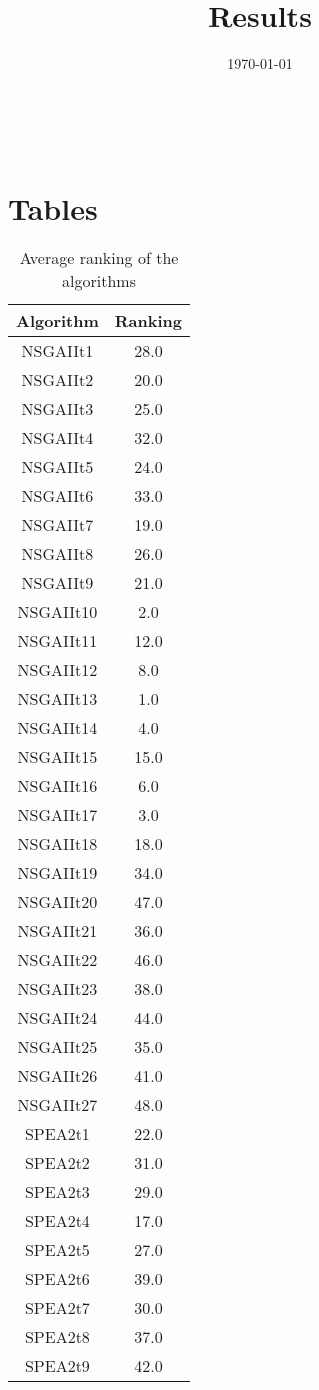 \documentclass{article}
\title{Results}
\author{}
\date{\today}
\begin{document}
\oddsidemargin 0in \topmargin 0in\maketitle
\
\section{Tables}
\begin{table}[!htp]
\centering
\caption{Average ranking of the algorithms}
\begin{tabular}{c|c}
Algorithm&Ranking\\
\hline
NSGAIIt1&28.0\\
NSGAIIt2&20.0\\
NSGAIIt3&25.0\\
NSGAIIt4&32.0\\
NSGAIIt5&24.0\\
NSGAIIt6&33.0\\
NSGAIIt7&19.0\\
NSGAIIt8&26.0\\
NSGAIIt9&21.0\\
NSGAIIt10&2.0\\
NSGAIIt11&12.0\\
NSGAIIt12&8.0\\
NSGAIIt13&1.0\\
NSGAIIt14&4.0\\
NSGAIIt15&15.0\\
NSGAIIt16&6.0\\
NSGAIIt17&3.0\\
NSGAIIt18&18.0\\
NSGAIIt19&34.0\\
NSGAIIt20&47.0\\
NSGAIIt21&36.0\\
NSGAIIt22&46.0\\
NSGAIIt23&38.0\\
NSGAIIt24&44.0\\
NSGAIIt25&35.0\\
NSGAIIt26&41.0\\
NSGAIIt27&48.0\\
SPEA2t1&22.0\\
SPEA2t2&31.0\\
SPEA2t3&29.0\\
SPEA2t4&17.0\\
SPEA2t5&27.0\\
SPEA2t6&39.0\\
SPEA2t7&30.0\\
SPEA2t8&37.0\\
SPEA2t9&42.0\\

\end{tabular}
\end{table}
\end{document}
